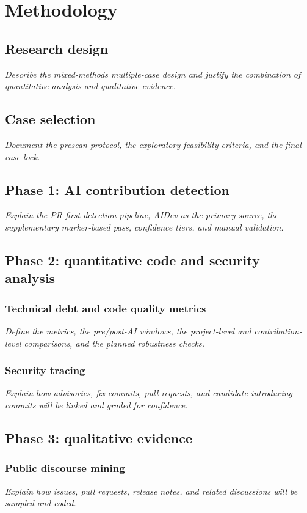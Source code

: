 \chapter{Methodology}
\label{ch:methodology}

\section{Research design}
\textit{Describe the mixed-methods multiple-case design and justify the combination of quantitative analysis and qualitative evidence.}

\section{Case selection}
\textit{Document the prescan protocol, the exploratory feasibility criteria, and the final case lock.}

\section{Phase 1: AI contribution detection}
\textit{Explain the PR-first detection pipeline, AIDev as the primary source, the supplementary marker-based pass, confidence tiers, and manual validation.}

\section{Phase 2: quantitative code and security analysis}
\subsection{Technical debt and code quality metrics}
\textit{Define the metrics, the pre/post-AI windows, the project-level and contribution-level comparisons, and the planned robustness checks.}

\subsection{Security tracing}
\textit{Explain how advisories, fix commits, pull requests, and candidate introducing commits will be linked and graded for confidence.}

\section{Phase 3: qualitative evidence}
\subsection{Public discourse mining}
\textit{Explain how issues, pull requests, release notes, and related discussions will be sampled and coded.}

